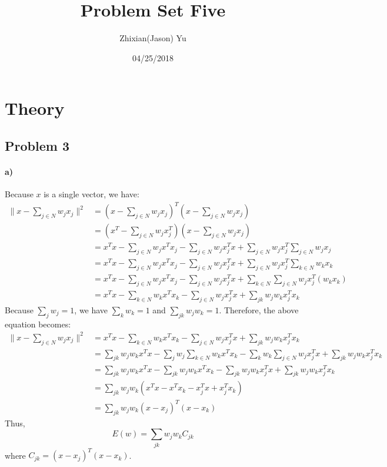 \documentclass{article}
\title{Problem Set Five}
\date{04/25/2018}
\author{Zhixian(Jason) Yu}
\begin{document}
\maketitle
{}
\newpage

\section{Theory}
\subsection*{Problem 3}
\paragraph{a)} Because $x$ is a single vector, we have:
\begin{align*}
\| x - \sum_{j \in N} w_j x_j \|^2 &= (x - \sum_{j \in N} w_j x_j)^T(x - \sum_{j \in N} w_j x_j) \\
&= (x^T - \sum_{j \in N} w_j x_j^T)(x - \sum_{j \in N} w_j x_j) \\
&= x^T x - \sum_{j \in N} w_j x^T x_j - \sum_{j \in N} w_j x_j^T x + \sum_{j \in N} w_j x_j^T\sum_{j \in N} w_j x_j \\
&= x^T x - \sum_{j \in N} w_j x^T x_j - \sum_{j \in N} w_j x_j^T x + \sum_{j \in N} w_j x_j^T\sum_{k \in N} w_k x_k \\
&= x^T x - \sum_{j \in N} w_j x^T x_j - \sum_{j \in N} w_j x_j^T x + \sum_{k \in N}\sum_{j \in N} w_j x_j^T (w_k x_k) \\
&= x^T x - \sum_{k \in N} w_k x^T x_k - \sum_{j \in N} w_j x_j^T x + \sum_{jk} w_j w_k x_j^T x_k
\end{align*}
Because $\sum_{j} w_j = 1$, we have $\sum_{k} w_k = 1$ and $\sum_{jk} w_j w_k = 1$. Therefore, the above equation becomes:
\begin{align*}
\| x - \sum_{j \in N} w_j x_j \|^2 &= x^T x - \sum_{k \in N} w_k x^T x_k - \sum_{j \in N} w_j x_j^T x + \sum_{jk} w_j w_k x_j^T x_k \\
&= \sum_{jk} w_j w_k x^T x - \sum_{j} w_j \sum_{k \in N} w_k x^T x_k - \sum_{k} w_k \sum_{j \in N} w_j x_j^T x + \sum_{jk} w_j w_k x_j^T x_k \\
&= \sum_{jk} w_j w_k x^T x - \sum_{jk} w_j w_k x^T x_k - \sum_{jk} w_j w_k x_j^T x + \sum_{jk} w_j w_k x_j^T x_k \\
&= \sum_{jk} w_j w_k (x^T x - x^T x_k - x_j^T x + x_j^T x_k) \\
&= \sum_{jk} w_j w_k (x-x_j)^T(x-x_k)
\end{align*}
Thus, \[ E(w) = \sum_{jk} w_j w_k C_{jk} \] where $C_{jk} = (x-x_j)^T(x-x_k)$.
\end{document}

